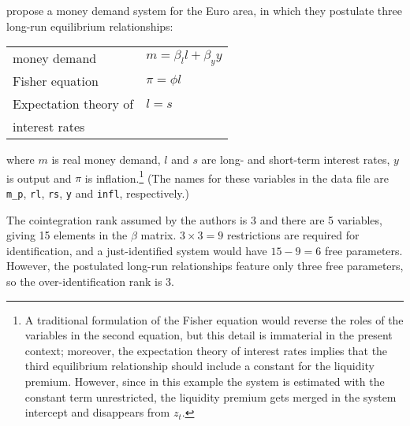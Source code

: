 \cite{brand-cassola04} propose a money demand system for the Euro
area, in which they postulate three long-run equilibrium
relationships:
%
\begin{center}
\begin{tabular}{ll}
  money demand & $m = \beta_l l + \beta_y y$ \\
  Fisher equation & $\pi = \phi l$ \\
  Expectation theory of & $l = s$ \\ [-4pt]
  interest rates
\end{tabular}
\end{center}
%
where $m$ is real money demand, $l$ and $s$ are long- and short-term
interest rates, $y$ is output and $\pi$ is inflation.\footnote{A
  traditional formulation of the Fisher equation would reverse the
  roles of the variables in the second equation, but this detail is
  immaterial in the present context; moreover, the expectation theory
  of interest rates implies that the third equilibrium relationship
  should include a constant for the liquidity premium. However, since
  in this example the system is estimated with the constant term
  unrestricted, the liquidity premium gets merged in the system
  intercept and disappears from $z_t$.}  (The names for these
variables in the  data file are \verb|m_p|, \texttt{rl},
\texttt{rs}, \texttt{y} and \texttt{infl}, respectively.)

The cointegration rank assumed by the authors is 3 and there are 5
variables, giving 15 elements in the $\beta$ matrix.  $3 \times 3 = 9$
restrictions are required for identification, and a just-identified
system would have $15 - 9 = 6$ free parameters.  However, the
postulated long-run relationships feature only three free parameters,
so the over-identification rank is 3.

